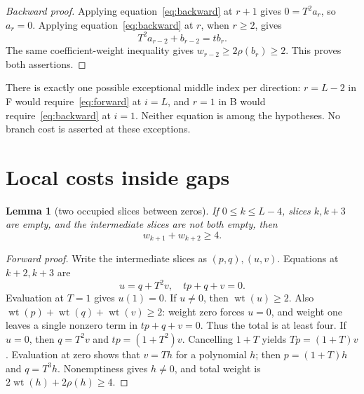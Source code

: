 \documentclass{article}
\newtheorem{lemma}{Lemma}
\DeclareMathOperator{\wt}{wt}
\begin{document}
\begin{proof}[Backward proof]
  Applying equation~\eqref{eq:backward} at \(r + 1\) gives \(0 = T^2 a_r\), so \(a_r = 0\).
  Applying equation~\eqref{eq:backward} at \(r\), when \(r \ge 2\), gives
  \begin{equation}
    T^2 a_{r-2} + b_{r-2} = t b_r.
  \end{equation}
  The same coefficient-weight inequality gives \(w_{r-2} \ge 2\rho(b_r) \ge 2\). This proves both
  assertions.
\end{proof}

There is exactly one possible exceptional middle index per direction: \(r = L-2\) in F would
require~\eqref{eq:forward} at \(i = L\), and \(r = 1\) in B would require~\eqref{eq:backward} at \(i = 1\). Neither equation is among the
hypotheses. No branch cost is asserted at these exceptions.

\section{Local costs inside gaps}\label{sec:gaps}

\begin{lemma}[two occupied slices between zeros]\label{lem:two}
  If \(0 \le k \le L-4\), slices \(k, k + 3\) are empty, and the intermediate slices are not both
  empty, then
  \begin{equation}
    w_{k+1} + w_{k+2} \ge 4.
  \end{equation}
\end{lemma}

\begin{proof}[Forward proof]
  Write the intermediate slices as \((p,q), (u,v)\). Equations at \(k + 2, k + 3\) are
  \begin{equation}
    u = q + T^2 v, \quad tp + q + v = 0.
  \end{equation}
  Evaluation at \(T = 1\) gives \(u(1) = 0\). If \(u \ne 0\), then \(\wt(u) \ge 2\). Also
  \(\wt(p) + \wt(q) + \wt(v) \ge 2\): weight zero forces \(u = 0\), and weight one leaves a single
  nonzero term in \(tp + q + v = 0\). Thus the total is at least four. If \(u = 0\), then
  \(q = T^2 v\) and \(tp = (1 + T^2)v\). Cancelling \(1 + T\) yields \(Tp = (1 + T)v\). Evaluation
  at zero shows that \(v = Th\) for a polynomial \(h\); then \(p = (1 + T)h\) and \(q = T^3 h\).
  Nonemptiness gives \(h \ne 0\), and total weight is \(2\wt(h) + 2\rho(h) \ge 4\).
\end{proof}
\end{document}
